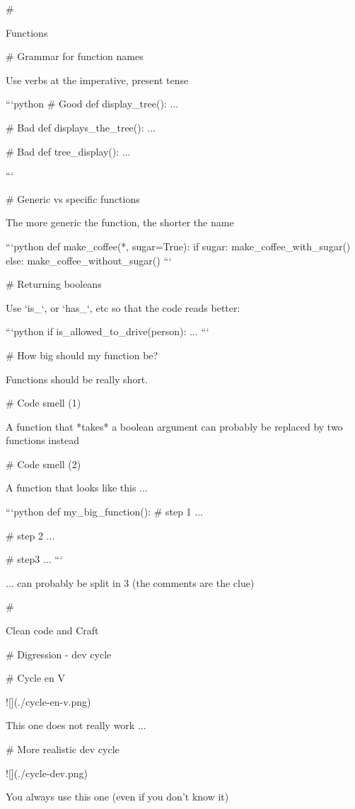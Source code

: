 #

\huge \center Functions


# Grammar for function names

Use verbs at the imperative, present tense

```python
# Good
def display_tree():
    ...

# Bad
def displays_the_tree():
    ...

# Bad
def tree_display():
    ...

```

# Generic vs specific functions

The more generic the function, the shorter the name

```python
def make_coffee(*, sugar=True):
    if sugar:
        make_coffee_with_sugar()
   else:
        make_coffee_without_sugar()
```



# Returning booleans

Use `is_`, or `has_`, etc so that the code reads better:

```python
if is_allowed_to_drive(person):
    ...
```

# How big should my function be?

Functions should be really short.

# Code smell (1)

A function that *takes* a boolean argument can probably be
replaced by two functions instead

# Code smell (2)

A function that looks like this ...

```python
def my_big_function():
    # step 1
    ...

    # step 2
    ...

    # step3
    ...
```

... can probably be split in 3 (the comments are the clue)

#

\huge \center Clean code and Craft

# Digression - dev cycle

# Cycle en V

![](./cycle-en-v.png)

This one does not really work ...

# More realistic dev cycle

![](./cycle-dev.png)

\vfill

You always use this one (even if you don't know it)

